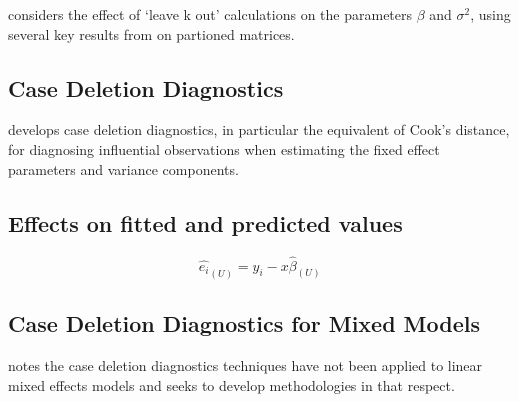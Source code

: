 \documentclass[Chap5amain.tex]{subfiles}
\begin{document}
 \citet{Haslett99} considers the effect of `leave k out'
 calculations on the parameters $\beta$ and $\sigma^{2}$, using
 several key results from \citet{HaslettHayes} on partioned
 matrices.
 
 
 
 
 
% 
% 
% 
 
 

\newpage
\subsection{Case Deletion Diagnostics} %


\citet{CPJ} develops  case deletion diagnostics, in particular the equivalent of  Cook's distance, for diagnosing influential observations when estimating the fixed effect parameters and variance components.

\subsection{Effects on fitted and predicted values}
\begin{equation}
\hat{e_{i}}_{(U)} = y_{i} - x\hat{\beta}_{(U)}
\end{equation}




\subsection{Case Deletion Diagnostics for Mixed Models}

\citet{Christiansen} notes the case deletion diagnostics techniques have not been applied to linear mixed effects models and seeks to develop methodologies in that respect.
\end{document}
